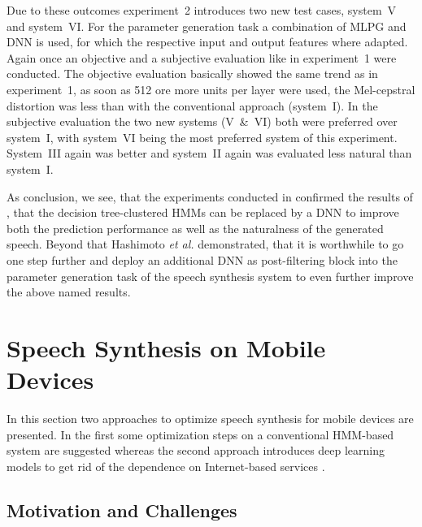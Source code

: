 Due to these outcomes experiment~2 introduces two new test cases, system~V and system~VI. For the parameter generation task a combination of \ac{MLPG} and \ac{DNN} is used, for which the respective input and output features where adapted. Again once an objective and a subjective evaluation like in experiment~1 were conducted. The objective evaluation basically showed the same trend as in experiment~1, as soon as 512 ore more units per layer were used, the Mel-cepstral distortion was less than with the conventional approach (system~I). In the subjective evaluation the two new systems (V~\&~VI) both were preferred over system~I, with system~VI being the most preferred system of this experiment. System~III again was better and system~II again was evaluated less natural than system~I.

As conclusion, we see, that the experiments conducted in \cite{hashimoto:effect} confirmed the results of \cite{zen:deepstatistical}, that the decision tree-clustered \acp{HMM} can be replaced by a \ac{DNN} to improve both the prediction performance as well as the naturalness of the generated speech. Beyond that Hashimoto \textit{et al.} demonstrated, that it is worthwhile to go one step further and deploy an additional \ac{DNN} as post-filtering block into the parameter generation task of the speech synthesis system to even further improve the above named results.


\section{Speech Synthesis on Mobile Devices}
\label{sec:embeddedspeech}

In this section two approaches to optimize speech synthesis for mobile devices are presented. In the first some optimization steps on a conventional \ac{HMM}-based system are suggested \cite{toth:optimizing} whereas the second approach introduces deep learning models to get rid of the dependence on Internet-based services \cite{boros:robust}.

\subsection{Motivation and Challenges}
\label{subsec:motembedded}

